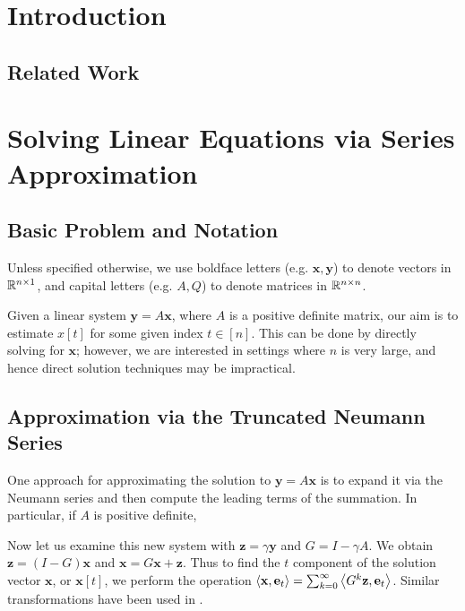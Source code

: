 \section{Introduction}


\subsection{Related Work}


\section{Solving Linear Equations via Series Approximation}

\subsection{Basic Problem and Notation}

Unless specified otherwise, we use boldface letters (e.g. $\mathbf{x},\mathbf{y}$) to denote vectors in $\mathbb{R}^{n\times 1}$, and capital letters (e.g. $A,Q$) to denote matrices in $\mathbb{R}^{n\times n}$.


Given a linear system $\mathbf{y} = A\mathbf{x}$, where $A$ is a positive definite matrix, our aim is to estimate $x[t]$ for some given index $t\in[n]$. 
This can be done by directly solving for $\mathbf{x}$; however, we are interested in settings where $n$ is very large, and hence direct solution techniques may be impractical. 


\subsection{Approximation via the Truncated Neumann Series}

One approach for approximating the solution to $\mathbf{y} = A\mathbf{x}$ is to expand it via the Neumann series and then compute the leading terms of the summation.
In particular, if $A$ is positive definite, 

Now let us examine this new system with $\mathbf{z} = \gamma \mathbf{y}$ and $G = I - \gamma A$. 
We obtain $\mathbf{z} = (I - G)\mathbf{x}$ and $\mathbf{x} = G\mathbf{x} + \mathbf{z}$. 
Thus to find the $t$ component of the solution vector $\mathbf{x}$, or $\mathbf{x}[t]$, we perform the operation $\left< \mathbf{x}, \mathbf{e}_t \right> = \sum_{k=0}^\infty \left< G^k \mathbf{z}, \mathbf{e}_t \right>$. 
Similar transformations have been used in \cite{dimov2015new, lee2014asynchronous, wu2016multi}.

